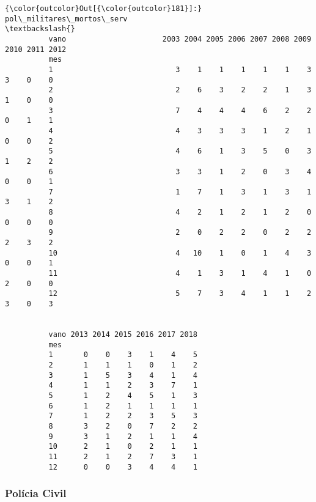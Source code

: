 \documentclass[11pt]{article}
\begin{document}
\begin{Verbatim}[commandchars=\\\{\}]
{\color{outcolor}Out[{\color{outcolor}181}]:}      pol\_militares\_mortos\_serv                                               \textbackslash{}
          vano                      2003 2004 2005 2006 2007 2008 2009 2010 2011 2012   
          mes                                                                           
          1                            3    1    1    1    1    1    3    3    0    0   
          2                            2    6    3    2    2    1    3    1    0    0   
          3                            7    4    4    4    6    2    2    0    1    1   
          4                            4    3    3    3    1    2    1    0    0    2   
          5                            4    6    1    3    5    0    3    1    2    2   
          6                            3    3    1    2    0    3    4    0    0    1   
          7                            1    7    1    3    1    3    1    3    1    2   
          8                            4    2    1    2    1    2    0    0    0    0   
          9                            2    0    2    2    0    2    2    2    3    2   
          10                           4   10    1    0    1    4    3    0    0    1   
          11                           4    1    3    1    4    1    0    2    0    0   
          12                           5    7    3    4    1    1    2    3    0    3   
          
                                              
          vano 2013 2014 2015 2016 2017 2018  
          mes                                 
          1       0    0    3    1    4    5  
          2       1    1    1    0    1    2  
          3       1    5    3    4    1    4  
          4       1    1    2    3    7    1  
          5       1    2    4    5    1    3  
          6       1    2    1    1    1    1  
          7       1    2    2    3    5    3  
          8       3    2    0    7    2    2  
          9       3    1    2    1    1    4  
          10      2    1    0    2    1    1  
          11      2    1    2    7    3    1  
          12      0    0    3    4    4    1  
\end{Verbatim}
            
    \hypertarget{poluxedcia-civil}{%
\subsubsection{Polícia Civil}\label{poluxedcia-civil}}
\end{document}
